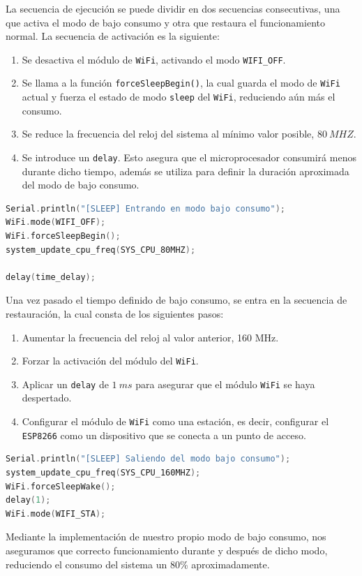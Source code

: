 La secuencia de ejecución se puede dividir en dos secuencias consecutivas, una que activa el modo de bajo consumo y otra que restaura el funcionamiento normal. La secuencia de activación es la siguiente:

\begin{enumerate}
    \item Se desactiva el módulo de \texttt{WiFi}, activando el modo \texttt{WIFI\_OFF}.
    \item Se llama a la función \texttt{forceSleepBegin()}, la cual guarda el modo de \texttt{WiFi} actual y fuerza el estado de modo \texttt{sleep} del \texttt{WiFi}, reduciendo aún más el consumo.
    \item Se reduce la frecuencia del reloj del sistema al mínimo valor posible, $80\ MHZ$.
    \item Se introduce un \texttt{delay}. Esto asegura que el microprocesador consumirá menos durante dicho tiempo, además se utiliza para definir la duración aproximada del modo de bajo consumo.
\end{enumerate}

\begin{lstlisting}[captionpos=b, caption={Activación modo bajo consumo}, language=c++]
Serial.println("[SLEEP] Entrando en modo bajo consumo");
WiFi.mode(WIFI_OFF);
WiFi.forceSleepBegin();
system_update_cpu_freq(SYS_CPU_80MHZ);

delay(time_delay);
\end{lstlisting}

Una vez pasado el tiempo definido de bajo consumo, se entra en la secuencia de restauración, la cual consta de los siguientes pasos:

\begin{enumerate}
    \item Aumentar la frecuencia del reloj al valor anterior, 160 MHz.
    \item Forzar la activación del módulo del \texttt{WiFi}.
    \item Aplicar un \texttt{delay} de $1\ ms$ para asegurar que el módulo \texttt{WiFi} se haya despertado.
    \item Configurar el módulo de \texttt{WiFi} como una estación, es decir, configurar el \texttt{ESP8266} como un dispositivo que se conecta a un punto de acceso.
\end{enumerate}

\begin{lstlisting}[captionpos=b, caption={Restauración modo bajo consumo}, language=c++]
Serial.println("[SLEEP] Saliendo del modo bajo consumo");
system_update_cpu_freq(SYS_CPU_160MHZ);
WiFi.forceSleepWake();
delay(1);
WiFi.mode(WIFI_STA);
\end{lstlisting}

Mediante la implementación de nuestro propio modo de bajo consumo, nos aseguramos que correcto funcionamiento durante y después de dicho modo, reduciendo el consumo del sistema un 80\% aproximadamente.

